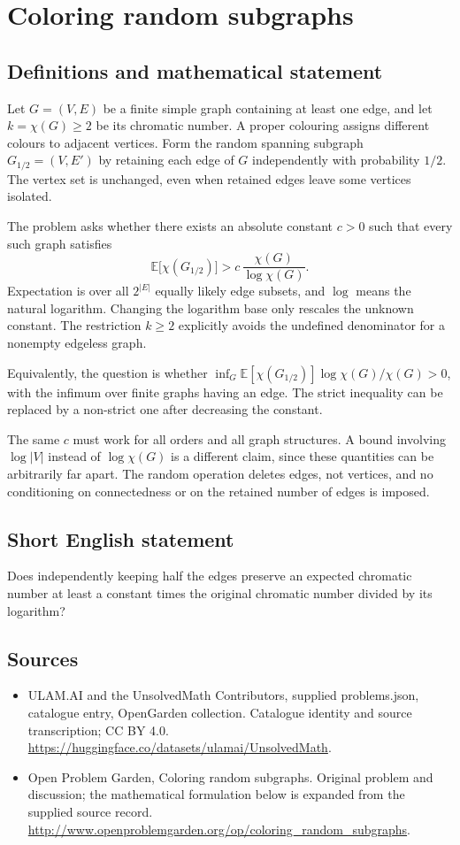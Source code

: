\documentclass[11pt,a4paper]{article}
\begin{document}
\section*{Coloring random subgraphs}\label{statement}

\subsection{Definitions and mathematical statement}
Let $G=(V,E)$ be a finite simple graph containing at least one edge,
and let $k=\chi(G)\ge2$ be its chromatic number. A proper colouring
assigns different colours to adjacent vertices. Form the random
spanning subgraph $G_{1/2}=(V,E')$ by retaining each edge of $G$
independently with probability $1/2$. The vertex set is unchanged,
even when retained edges leave some vertices isolated.

The problem asks whether there exists an absolute constant $c>0$
such that every such graph satisfies
\[
                   \mathbb E\bigl[\chi(G_{1/2})\bigr]
                      >c\,\frac{\chi(G)}{\log\chi(G)}.
\]
Expectation is over all $2^{|E|}$ equally likely edge subsets, and
$\log$ means the natural logarithm. Changing the logarithm base only
rescales the unknown constant. The restriction $k\ge2$ explicitly
avoids the undefined denominator for a nonempty edgeless graph.

Equivalently, the question is whether
$\inf_G\mathbb E[\chi(G_{1/2})]\log\chi(G)/\chi(G)>0$, with the
infimum over finite graphs having an edge. The strict inequality can
be replaced by a non-strict one after decreasing the constant.

The same $c$ must work for all orders and all graph structures. A
bound involving $\log|V|$ instead of $\log\chi(G)$ is a different
claim, since these quantities can be arbitrarily far apart. The
random operation deletes edges, not vertices, and no conditioning
on connectedness or on the retained number of edges is imposed.
\subsection{Short English statement}
Does independently keeping half the edges preserve an expected chromatic number at least a constant times the original chromatic number divided by its logarithm?
\subsection{Sources}
\begin{itemize}
\item[S1] ULAM.AI and the UnsolvedMath Contributors, supplied problems.json, catalogue entry, OpenGarden collection. Catalogue identity and source transcription; CC BY 4.0.
\url{https://huggingface.co/datasets/ulamai/UnsolvedMath}.
\item[S2] Open Problem Garden, Coloring random subgraphs. Original problem and discussion; the mathematical formulation below is expanded from the supplied source record.
\url{http://www.openproblemgarden.org/op/coloring_random_subgraphs}.
\end{itemize}
\end{document}
